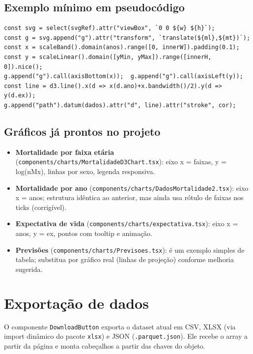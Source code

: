 \documentclass[12pt,a4paper]{article}
\begin{document}
\subsection*{Exemplo mínimo em pseudocódigo}
\begin{verbatim}
const svg = select(svgRef).attr("viewBox", `0 0 ${w} ${h}`);
const g = svg.append("g").attr("transform", `translate(${ml},${mt})`);
const x = scaleBand().domain(anos).range([0, innerW]).padding(0.1);
const y = scaleLinear().domain([yMin, yMax]).range([innerH, 0]).nice();
g.append("g").call(axisBottom(x));  g.append("g").call(axisLeft(y));
const line = d3.line().x(d => x(d.ano)+x.bandwidth()/2).y(d => y(d.ex));
g.append("path").datum(dados).attr("d", line).attr("stroke", cor);
\end{verbatim}

\subsection*{Gráficos já prontos no projeto}
\begin{itemize}[leftmargin=*]
  \item \textbf{Mortalidade por faixa etária} (\texttt{components/charts/MortalidadeD3Chart.tsx}): eixo x = faixas, y = log(nMx), linhas por sexo, legenda responsiva.
  \item \textbf{Mortalidade por ano} (\texttt{components/charts/DadosMortalidade2.tsx}): eixo x = anos; estrutura idêntica ao anterior, mas ainda usa rótulo de faixas nos ticks (corrigível).
  \item \textbf{Expectativa de vida} (\texttt{components/charts/expectativa.tsx}): eixo x = anos, y = ex, pontos com tooltip e animação.
  \item \textbf{Previsões} (\texttt{components/charts/Previsoes.tsx}): é um exemplo simples de tabela; substitua por gráfico real (linhas de projeção) conforme melhoria sugerida.
\end{itemize}

\section{Exportação de dados}
O componente \texttt{DownloadButton} exporta o dataset atual em CSV, XLSX (via import dinâmico do pacote \texttt{xlsx}) e JSON (\texttt{.parquet.json}). Ele recebe o array a partir da página e monta cabeçalhos a partir das chaves do objeto.
\end{document}
